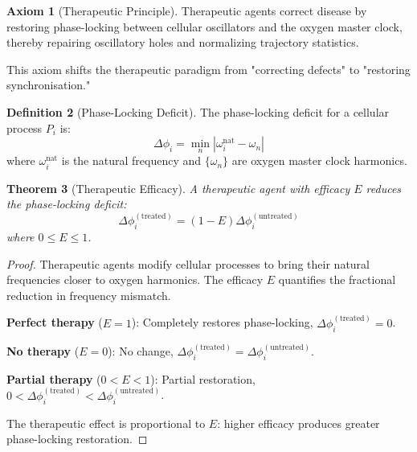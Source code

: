 \documentclass[11pt,twocolumn,a4paper]{article}
\newtheorem{theorem}{Theorem}[section]
\theoremstyle{definition}
\newtheorem{definition}[theorem]{Definition}
\newtheorem{axiom}[theorem]{Axiom}
\theoremstyle{remark}
\begin{document}
\begin{axiom}[Therapeutic Principle]
\label{ax:therapeutic_principle}
Therapeutic agents correct disease by restoring phase-locking between cellular oscillators and the oxygen master clock, thereby repairing oscillatory holes and normalizing trajectory statistics.
\end{axiom}

This axiom shifts the therapeutic paradigm from "correcting defects" to "restoring synchronisation."

\begin{definition}[Phase-Locking Deficit]
\label{def:phase_locking_deficit}
The phase-locking deficit for a cellular process $P_i$ is:
\begin{equation}
\Delta\phi_i = \min_{n} |\omega_i^{\mathrm{nat}} - \omega_n|
\label{eq:phase_locking_deficit}
\end{equation}
where $\omega_i^{\mathrm{nat}}$ is the natural frequency and $\{\omega_n\}$ are oxygen master clock harmonics.
\end{definition}

\begin{theorem}[Therapeutic Efficacy]
\label{thm:therapeutic_efficacy}
A therapeutic agent with efficacy $E$ reduces the phase-locking deficit:
\begin{equation}
\Delta\phi_i^{\mathrm{(treated)}} = (1 - E) \Delta\phi_i^{\mathrm{(untreated)}}
\label{eq:therapeutic_efficacy}
\end{equation}
where $0 \leq E \leq 1$.
\end{theorem}

\begin{proof}
Therapeutic agents modify cellular processes to bring their natural frequencies closer to oxygen harmonics. The efficacy $E$ quantifies the fractional reduction in frequency mismatch.

\textbf{Perfect therapy} ($E = 1$): Completely restores phase-locking, $\Delta\phi_i^{\mathrm{(treated)}} = 0$.

\textbf{No therapy} ($E = 0$): No change, $\Delta\phi_i^{\mathrm{(treated)}} = \Delta\phi_i^{\mathrm{(untreated)}}$.

\textbf{Partial therapy} ($0 < E < 1$): Partial restoration, $0 < \Delta\phi_i^{\mathrm{(treated)}} < \Delta\phi_i^{\mathrm{(untreated)}}$.

The therapeutic effect is proportional to $E$: higher efficacy produces greater phase-locking restoration.
\end{proof}
\end{document}
